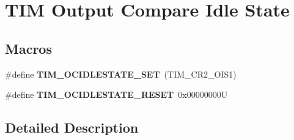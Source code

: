 \hypertarget{group___t_i_m___output___compare___idle___state}{}\section{T\+IM Output Compare Idle State}
\label{group___t_i_m___output___compare___idle___state}
\subsection*{Macros}
\begin{DoxyCompactItemize}
\item 
\mbox{\label{group___t_i_m___output___compare___idle___state_gad251b83b0e33ddd0ed2fb35aa747ef78}} 
\#define {\bfseries T\+I\+M\+\_\+\+O\+C\+I\+D\+L\+E\+S\+T\+A\+T\+E\+\_\+\+S\+ET}~(T\+I\+M\+\_\+\+C\+R2\+\_\+\+O\+I\+S1)
\item 
\mbox{\label{group___t_i_m___output___compare___idle___state_ga56505fe4142096454f1da97683ce8bc2}} 
\#define {\bfseries T\+I\+M\+\_\+\+O\+C\+I\+D\+L\+E\+S\+T\+A\+T\+E\+\_\+\+R\+E\+S\+ET}~0x00000000U
\end{DoxyCompactItemize}


\subsection{Detailed Description}
